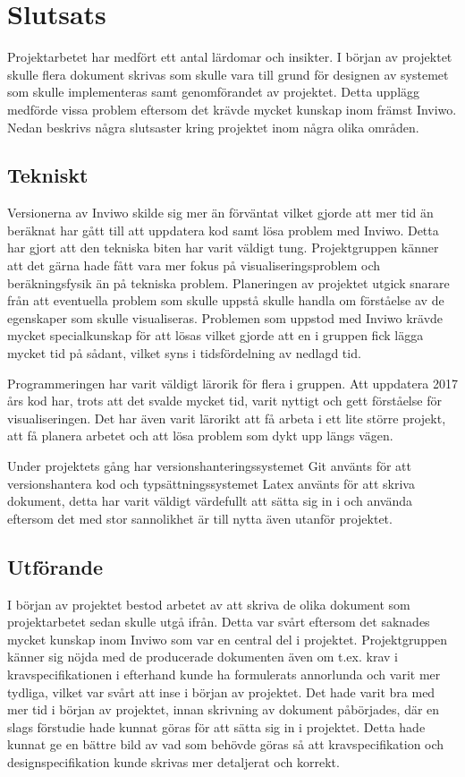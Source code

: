 \documentclass[a4paper,12pt]{article}
\begin{document}
\section{Slutsats}
\label{ch:slutsats} 
Projektarbetet har medfört ett antal lärdomar och insikter. I början av projektet skulle flera dokument skrivas som skulle vara till grund för designen av systemet som skulle implementeras samt genomförandet av projektet. Detta upplägg medförde vissa problem eftersom det krävde mycket kunskap inom främst Inviwo. Nedan beskrivs några slutsaster kring projektet inom några olika områden.

\subsection{Tekniskt}
Versionerna av Inviwo skilde sig mer än förväntat vilket gjorde att mer tid än beräknat har gått till att uppdatera kod samt lösa problem med Inviwo. Detta har gjort att den tekniska biten har varit väldigt tung. Projektgruppen känner att det gärna hade fått vara mer fokus på visualiseringsproblem och beräkningsfysik än på tekniska problem. Planeringen av projektet utgick snarare från att eventuella problem som skulle uppstå skulle handla om förståelse av de egenskaper som skulle visualiseras. Problemen som uppstod med Inviwo krävde mycket specialkunskap för att lösas vilket gjorde att en i gruppen fick lägga mycket tid på sådant, vilket syns i tidsfördelning av nedlagd tid. 

Programmeringen har varit väldigt lärorik för flera i gruppen. Att uppdatera 2017 års kod har, trots att det svalde mycket tid, varit nyttigt och gett förståelse för visualiseringen. Det har även varit lärorikt att få arbeta i ett lite större projekt, att få planera arbetet och att lösa problem som dykt upp längs vägen. 

Under projektets gång har versionshanteringssystemet Git använts för att versionshantera kod och typsättningssystemet Latex använts för att skriva dokument, detta har varit väldigt värdefullt att sätta sig in i och använda eftersom det med stor sannolikhet är till nytta även utanför projektet. 
\subsection{Utförande}
I början av projektet bestod arbetet av att skriva de olika dokument som projektarbetet sedan skulle utgå ifrån. Detta var svårt eftersom det saknades mycket kunskap inom Inviwo som  var en central del i projektet. Projektgruppen känner sig nöjda med de producerade dokumenten även om t.ex. krav i kravspecifikationen i efterhand kunde ha formulerats annorlunda och varit mer tydliga, vilket var svårt att inse i början av projektet. Det hade varit bra med mer tid i början av projektet, innan skrivning av dokument påbörjades, där en slags förstudie hade kunnat göras för att sätta sig in i projektet. Detta hade kunnat ge en bättre bild av vad som behövde göras så att kravspecifikation och designspecifikation kunde skrivas mer detaljerat och korrekt. 
\end{document}
